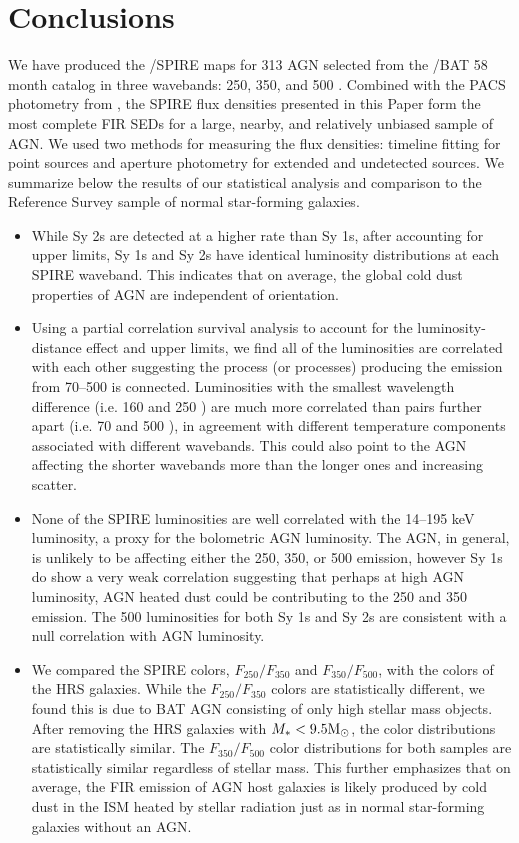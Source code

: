 \section{Conclusions}
We have produced the \herschel/SPIRE maps for 313 AGN selected from the \swift/BAT 58 month catalog in three wavebands: 250, 350, and 500 \um. Combined with the PACS photometry from \citet{Melendez:2014yu}, the SPIRE flux densities presented in this Paper form the most complete FIR SEDs for a large, nearby, and relatively unbiased sample of AGN. We used two methods for measuring the flux densities: timeline fitting for point sources and aperture photometry for extended and undetected sources. We summarize below the results of our statistical analysis and comparison to the \herschel{} Reference Survey sample of normal star-forming galaxies.
\begin{itemize}
\item While Sy 2s are detected at a higher rate than Sy 1s, after accounting for upper limits, Sy 1s and Sy 2s have identical luminosity distributions at each SPIRE waveband. This indicates that on average, the global cold dust properties of AGN are independent of orientation.
\item Using a partial correlation survival analysis to account for the luminosity-distance effect and upper limits, we find all of the \herschel{} luminosities are correlated with each other suggesting the process (or processes) producing the emission from 70--500 \um{} is connected. Luminosities with the smallest wavelength difference (i.e. 160 and 250 \um) are much more correlated than pairs further apart (i.e. 70 and 500 \um), in agreement with different temperature components associated with different wavebands. This could also point to the AGN affecting the shorter wavebands more than the longer ones and increasing scatter.
\item None of the SPIRE luminosities are well correlated with the 14--195 keV luminosity, a proxy for the bolometric AGN luminosity. The AGN, in general, is unlikely to be affecting either the 250, 350, or 500 \um emission, however Sy 1s do show a very weak correlation suggesting that perhaps at high AGN luminosity, AGN heated dust could be contributing to the 250 and 350 \um{} emission. The 500 \um{} luminosities for both Sy 1s and Sy 2s are consistent with a null correlation with AGN luminosity.
\item We compared the SPIRE colors, $F_{250}/F_{350}$ and $F_{350}/F_{500}$, with the colors of the HRS galaxies. While the $F_{250}/F_{350}$ colors are statistically different, we found this is due to BAT AGN consisting of only high stellar mass objects. After removing the HRS galaxies with $M_{*} < 9.5 \rm{M_{\odot}}$, the color distributions are statistically similar. The $F_{350}/F_{500}$ color distributions for both samples are statistically similar regardless of stellar mass. This further emphasizes that on average, the FIR emission of AGN host galaxies is likely produced by cold dust in the ISM heated by stellar radiation just as in normal star-forming galaxies without an AGN.

\end{itemize}
